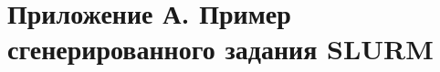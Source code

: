 \section*{Приложение А. Пример сгенерированного задания SLURM}
\label{app:job}

\renewcommand{\theFancyVerbLine}{%
    \scriptsize\ttfamily\textcolor{gray}{\arabic{FancyVerbLine}}%
}

\inputminted[linenos, numbersep=10pt, firstnumber=1, fontsize=\scriptsize]{bash}{code/example_job_0001.slurm}
